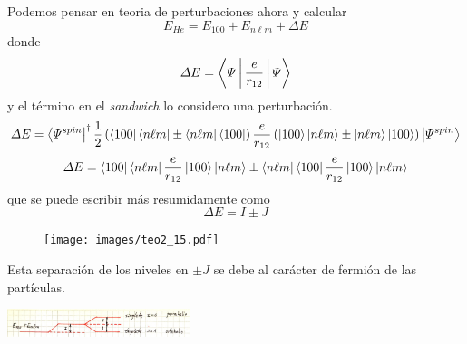 \documentclass[10pt,oneside]{CBFT_book}
\begin{document}
Podemos pensar en teoria de perturbaciones ahora y calcular 
\[
	E_{He} = E_{100} + E_{n\ell m} + \Delta E
\]
donde 
\[
	\Delta E = \Braket{\Psi|\frac{e}{r_{12}}|\Psi}
\]
y el término en el {\it sandwich} lo considero una perturbación.
\[
	\Delta E = \Bra{\Psi^{spin}}^\dagger \frac{1}{2}\left(\Bra{100}\Bra{n\ell m} \pm \Bra{n\ell m}\Bra{100}
	\right) \frac{e}{r_{12}} \left(\Ket{100}\Ket{n\ell m} \pm \Ket{n\ell m}\Ket{100}\right)\Ket{\Psi^{spin}}
\]
\[
	\Delta E = \Bra{100}\Bra{n\ell m}\frac{e}{r_{12}}\Ket{100}\Ket{n\ell m} \pm  
	\Bra{n\ell m}\Bra{100}\frac{e}{r_{12}}\Ket{100}\Ket{n\ell m}
\]
que se puede escribir más resumidamente como
\[
	\Delta E = I \pm J
\]

\begin{figure}[htb]
	\begin{center}
	\texttt{[image: images/teo2\_15.pdf]}
	\end{center}
	\caption{}
\end{figure} 

Esta separación de los niveles en $\pm J$ se debe al carácter de fermión de las partículas.

\includegraphics[width=0.4\textwidth]{images/fig_ft2_extra_identical2.jpg}

\end{document}
